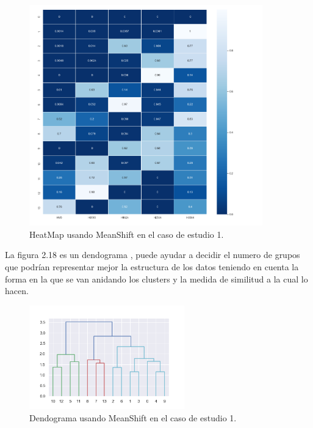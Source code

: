 	\begin{figure}[htb]
		\centering
		\includegraphics[width=0.9\textwidth]{./imagenes/caso1/heatmap_caso1_MeanShift}
		\caption{HeatMap usando MeanShift en el caso de estudio 1.} \label{fig:1}
	\end{figure}


	La figura 2.18 es un dendograma , puede ayudar a decidir el numero de grupos que podrían representar
	mejor la estructura de los datos teniendo en cuenta la forma en la que se van anidando los clusters
	y la medida de similitud a la cual lo hacen. \\

	\begin{figure}[htb]
		\centering
		\includegraphics[width=0.6\textwidth]{./imagenes/caso1/dendograma_caso1_MeanShift}
		\caption{Dendograma usando MeanShift en el caso de estudio 1.} \label{fig:1}
	\end{figure}

